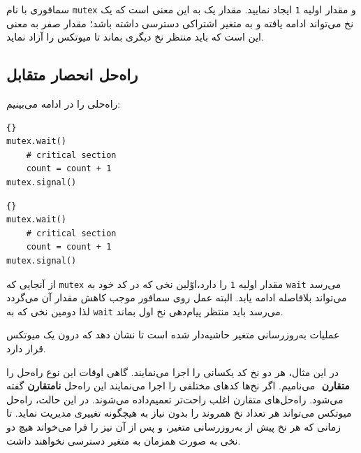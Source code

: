 \documentclass{book}
\newcommand{\clearemptydoublepage}{\newpage\cleardoublepage}
\begin{document}
    سمافوری با نام \texttt{mutex} و مقدار اولیه \texttt{1} ایجاد نمایید. 
    مقدار یک به این معنی است که یک نخ می‌تواند ادامه یافته و به متغیر اشتراکی دسترسی داشته باشد؛ مقدار صفر به معنی این است که 
    باید منتظر نخ دیگری بماند تا میوتکس را آزاد نماید. 


\clearemptydoublepage
\subsection{  راه‌حل انحصار متقابل}

    راه‌حلی را در ادامه می‌بینیم:

\begin{latin}
\begin{minipage}[t]{2in}
\begin{latin}
\begin{lstlisting}[title=\rl{نخ \lr{A}}]{}
mutex.wait()
    # critical section
    count = count + 1
mutex.signal()
\end{lstlisting}
\end{latin}
\end{minipage}
\hfill
\begin{minipage}[t]{2in}
\begin{latin}
\begin{lstlisting}[title=\rl{نخ \lr{B}}]{}
mutex.wait()
    # critical section
    count = count + 1
mutex.signal()
\end{lstlisting}
\end{latin}
\end{minipage}
\end{latin}

    از آنجایی که \texttt{mutex} مقدار اولیه  \texttt{1} را دارد،اوّلین نخی که در کد خود به \texttt{wait} می‌رسد می‌تواند بلافاصله ادامه یابد.
    البته عمل  روی سمافور موجب کاهش مقدار آن می‌گردد لذا دومین نخی که به  \texttt{wait} می‌رسد باید منتظر پیام‌دهی نخ اول بماند. 

    عملیات به‌روزرسانی متغیر حاشیه‌دار شده است تا نشان دهد که درون یک میوتکس  قرار دارد. 
    
    در این مثال، هر دو نخ کد یکسانی را اجرا می‌نمایند. گاهی اوقات این نوع راه‌حل را \textbf{متقارن} ‌
    می‌نامیم. اگر نخ‌ها کدهای مختلفی را اجرا می‌نمایند این راه‌حل \textbf{نامتقارن}
    گفته می‌شود. راه‌حل‌های متقارن اغلب راحت‌تر تعمیم‌داده می‌شوند. در این حالت، راه‌حل  میوتکس می‌تواند هر تعداد نخ همروند را بدون 
    نیاز به هیچگونه تغییری مدیریت نماید. تا زمانی که هر نخ پیش از به‌روزرسانی متغیر،    و پس از آن نیز    
    را فرا می‌خواند هیچ دو نخی به صورت همزمان به متغیر  دسترسی نخواهند داشت.
\end{document}
